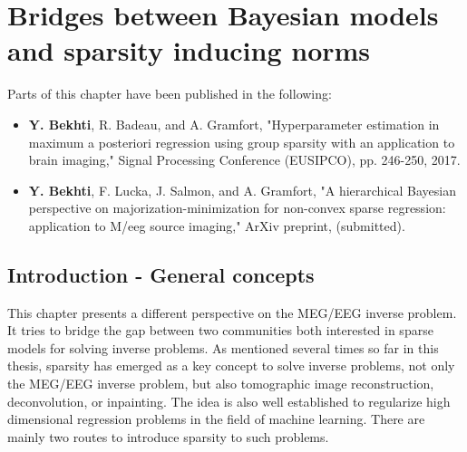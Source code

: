 
\chapter{Bridges between Bayesian models and sparsity inducing norms}
\label{chapter:bayesian}
\noindent\makebox[\linewidth]{\rule{0.75\paperwidth}{0.4pt}}
\noindent\makebox[\linewidth]{\rule{0.75\paperwidth}{0.4pt}}

\localtableofcontents %

\noindent\makebox[\linewidth]{\rule{0.75\paperwidth}{0.4pt}}
\noindent\makebox[\linewidth]{\rule{0.75\paperwidth}{0.4pt}}

\newpage
\vspace{1.5cm}
Parts of this chapter have been published in the following:
\begin{itemize}
\item \textbf{Y. Bekhti}, R. Badeau, and A. Gramfort, "Hyperparameter estimation in maximum a posteriori regression using group sparsity with an application to brain imaging," Signal Processing Conference (EUSIPCO), pp. 246-250, 2017.
\item \textbf{Y. Bekhti}, F. Lucka, J. Salmon, and A. Gramfort, "A hierarchical Bayesian perspective on majorization-minimization for non-convex sparse regression: application to M/\ac{eeg} source imaging," ArXiv preprint, (submitted).
\end{itemize}
\newpage

\section{Introduction - General concepts}
\label{sec:bayes_intro}

This chapter presents a different perspective on the MEG/EEG inverse problem. It tries to bridge the gap between two communities both interested in sparse models for solving inverse problems. As mentioned several times so far in this thesis, sparsity has emerged as a key concept to solve inverse problems, not only the MEG/EEG inverse problem, but also tomographic image reconstruction, deconvolution, or inpainting. The idea is also well established to regularize high dimensional regression problems in the field of machine learning. There are mainly two routes to introduce sparsity to such problems.

